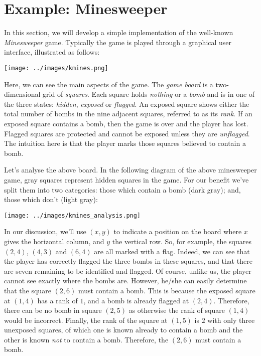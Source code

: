 \newpage
\section{Example: Minesweeper}
\label{s_minesweeper}
In this section, we will develop a simple implementation of the well-known {\em Minesweeper} game.  Typically the game is played through a graphical user interface, illustrated as follows:
\begin{center}
\texttt{[image: ../images/kmines.png]}
\end{center}
Here, we can see the main aspects of the game.  The {\em game board} is a two-dimensional grid of {\em squares}.  Each square holds {\em nothing} or a {\em bomb} and is in one of the three states: {\em hidden}, {\em exposed} or {\em flagged}.  An exposed square shows either the total number of bombs in the nine adjacent squares, referred to as its {\em rank}.  If an exposed square contains a bomb, then the game is over and the player has lost.  Flagged squares are protected and cannot be exposed unless they are {\em unflagged}.  The intuition here is that the player marks those squares believed to contain a bomb.  

Let's analyse the above board.  In the following diagram of the above minesweeper game, gray squares represent hidden squares in the game.  For our benefit we've split them into two categories: those which contain a bomb (dark gray); and, those which don't (light gray): 

\begin{center}
\texttt{[image: ../images/kmines\_analysis.png]}
\end{center}

In our discussion, we'll use $(x,y)$ to indicate a position on the board where $x$ gives the horizontal column, and $y$ the vertical row.  So, for example, the squares $(2,4)$, $(4,3)$ and $(6,4)$ are all marked with a flag.  Indeed, we can see that the player has correctly flagged the three bombs in these squares, and that there are seven remaining to be identified and flagged.  Of course, unlike us, the player cannot see exactly where the bombs are.  However, he/she can easily determine that the square $(2,6)$ must contain a bomb.  This is because the exposed square at $(1,4)$ has a rank of $1$, and a bomb is already flagged at $(2,4)$.  Therefore, there can be no bomb in square $(2,5)$ as otherwise the rank of square $(1,4)$ would be incorrect.  Finally, the rank of the square at $(1,5)$ is $2$ with only three unexposed squares, of which one is known already to contain a bomb and the other is known {\em not} to contain a bomb.  Therefore, the $(2,6)$ must contain a bomb.

